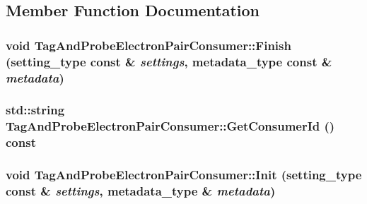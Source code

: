 \subsection{Member Function Documentation}
\hypertarget{classTagAndProbeElectronPairConsumer_a97da0cf11b36504fbd912e524fd496f9}{
\subsubsection[{Finish}]{\setlength{\rightskip}{0pt plus 5cm}void TagAndProbeElectronPairConsumer::Finish (setting\_\-type const \& {\em settings}, \/  metadata\_\-type const \& {\em metadata})}}
\label{classTagAndProbeElectronPairConsumer_a97da0cf11b36504fbd912e524fd496f9}
\hypertarget{classTagAndProbeElectronPairConsumer_adbd1968930d4a8c023f92359beabdac3}{
\subsubsection[{GetConsumerId}]{\setlength{\rightskip}{0pt plus 5cm}std::string TagAndProbeElectronPairConsumer::GetConsumerId () const}}
\label{classTagAndProbeElectronPairConsumer_adbd1968930d4a8c023f92359beabdac3}
\hypertarget{classTagAndProbeElectronPairConsumer_aa2d7db73740dc10f504d07e0840140a0}{
\subsubsection[{Init}]{\setlength{\rightskip}{0pt plus 5cm}void TagAndProbeElectronPairConsumer::Init (setting\_\-type const \& {\em settings}, \/  metadata\_\-type \& {\em metadata})}}
\label{classTagAndProbeElectronPairConsumer_aa2d7db73740dc10f504d07e0840140a0}
